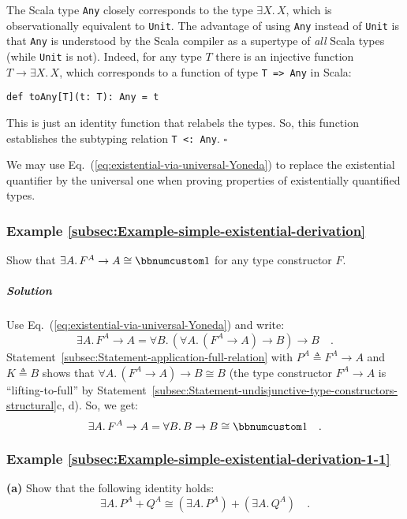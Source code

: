 The Scala type \lstinline!Any! closely corresponds to the type $\exists X.\,X$,
which is observationally equivalent to \lstinline!Unit!. The advantage
of using \lstinline!Any! instead of \lstinline!Unit! is that \lstinline!Any!
is understood by the Scala compiler as a supertype of \emph{all} Scala
types (while \lstinline!Unit! is not). Indeed, for any type $T$
there is an injective function $T\rightarrow\exists X.\,X$, which
corresponds to a function of type \lstinline!T => Any! in Scala:
\begin{lstlisting}
def toAny[T](t: T): Any = t
\end{lstlisting}
 This is just an identity function that relabels the types. So, this
function establishes the subtyping relation \lstinline!T <: Any!.
$\square$

We may use Eq.~(\ref{eq:existential-via-universal-Yoneda}) to replace
the existential quantifier by the universal one when proving properties
of existentially quantified types.

\subsubsection{Example \label{subsec:Example-simple-existential-derivation}\ref{subsec:Example-simple-existential-derivation}}

Show that $\exists A.\,F^{A}\rightarrow A\cong\bbnum 1$ for any type
constructor $F$.

\subparagraph{Solution}

Use Eq.~(\ref{eq:existential-via-universal-Yoneda}) and write:
\[
\exists A.\,F^{A}\rightarrow A=\forall B.\,(\forall A.\,(F^{A}\rightarrow A)\rightarrow B)\rightarrow B\quad.
\]
Statement~\ref{subsec:Statement-application-full-relation} with
$P^{A}\triangleq F^{A}\rightarrow A$ and $K\triangleq B$ shows that
$\forall A.\,(F^{A}\rightarrow A)\rightarrow B\cong B$ (the type
constructor $F^{A}\rightarrow A$ is \textsf{``}lifting-to-full\textsf{''} by Statement~\ref{subsec:Statement-undisjunctive-type-constructors-structural}c,
d). So, we get:
\[
\exists A.\,F^{A}\rightarrow A=\forall B.\,B\rightarrow B\cong\bbnum 1\quad.
\]


\subsubsection{Example \label{subsec:Example-simple-existential-derivation-1-1}\ref{subsec:Example-simple-existential-derivation-1-1}}

\textbf{(a)} Show that the following identity holds: 
\[
\exists A.\,P^{A}+Q^{A}\cong(\exists A.\,P^{A})+(\exists A.\,Q^{A})\quad.
\]

